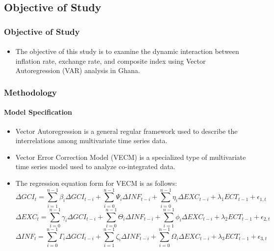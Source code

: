 \documentclass[12pt]{beamer}
\begin{document}
\begin{frame}
	\section{Objective of Study}
	\frametitle{Objective of Study}
	\framesubtitle{}
\begin{itemize}
\item The objective of this study is to examine the dynamic interaction between inflation rate, exchange rate, and composite index using Vector Autoregression (VAR) analysis in Ghana. 
	
	

\end{itemize}

\end{frame}	



	
		\begin{frame}
			
		\frametitle{Methodology}
		\framesubtitle{ Model Specification} 
		\begin{itemize} \scriptsize
		\item Vector Autoregression is a general regular framework used to describe the interrelations among multivariate time series data.
		
		\item Vector Error Correction Model (VECM) is a specialized type of multivariate time series model used to analyze co-integrated data.
		\vspace{0.1cm} 
		\item The regression equation form for VECM is as follows:
		\tiny
		 \begin{equation}
	  \Delta GCI_t= \sum_{i=1}^{n-1} \beta_i \Delta GCI_{t-i} + \sum_{i=0}^{n-1} \Psi_i \Delta INF_{t-i} + \sum_{i=0}^{n-1} \eta_i \Delta EXC_{t-i} + \lambda_{1}ECT_{t-1} +\epsilon_{1,t} \end{equation}
		 		\begin{equation} \Delta  EXC_t= \sum_{i=0}^{n-1} \gamma_i \Delta GCI_{t-i} + \sum_{i=0}^{n-1} \Theta_i \Delta INF_{t-i} + \sum_{i=1}^{n-1} \phi_i \Delta EXC_{t-i} + \lambda_{2}ECT_{t-1} + \epsilon_{2,t} \end{equation} 	 			
		\begin{equation}  \Delta INF_t= \sum_{i=0}^{n-1} \Gamma_i \Delta GCI_{t-i} + \sum_{i=1}^{n-1} \zeta_i \Delta INF_{t-i} + \sum_{i=0}^{n-1} \Omega_i \Delta EXC_{t-i} + \lambda_{3}ECT_{t-1} + \epsilon_{3,t} \end{equation} 		 
		 
		
	\end{itemize}
	\end{frame}
\end{document}
